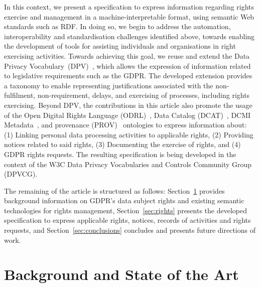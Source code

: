 \documentclass{IOS-Book-Article}     %
\begin{document}
In this context, we present a specification to express information regarding rights exercise and management in a machine-interpretable format, using semantic Web standards such as RDF.
In doing so, we begin to address the automation, interoperability and standardisation challenges identified above, towards enabling the development of tools for assisting individuals and organisations in right exercising activities. 
Towards achieving this goal, we reuse and extend the Data Privacy Vocabulary~(DPV)~\cite{panditCreatingVocabularyData2019,pandit2024dpv}, which allows the expression of information related to legislative requirements such as the GDPR.
The developed extension provides a taxonomy to enable representing justifications associated with the non-fulfilment, non-requirement, delays, and exercising of processes, including rights exercising.
Beyond DPV, the contributions in this article also promote the usage of the Open Digital Rights Language (ODRL)~\cite{iannella_odrl_2018}, Data Catalog (DCAT)~\cite{albertoni_dcat_2024}, DCMI Metadata~\cite{dcmi_2020}, and provenance (PROV)~\cite{lebo_prov_2013} ontologies to express information about: 
(1) Linking personal data processing activities to applicable rights,
(2) Providing notices related to said rights,
(3) Documenting the exercise of rights, and
(4) GDPR rights requests.
The resulting specification is being developed in the context of the W3C Data Privacy Vocabularies and Controls Community Group (DPVCG).

The remaining of the article is structured as follows: Section~\ref{sec:sota} provides background information on GDPR's data subject rights and existing semantic technologies for rights management, Section~\ref{sec:rights} presents the developed specification to express applicable rights, notices, records of activities and rights requests, and Section~\ref{sec:conclusions} concludes and presents future directions of work.

\section{Background and State of the Art}
\label{sec:sota}
\end{document}
